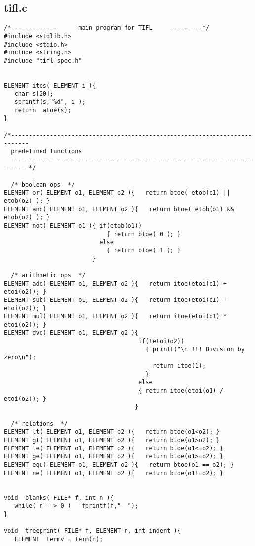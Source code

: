 \subsection{tifl.c}
\begin{verbatim}
/*-------------      main program for TIFL     ---------*/
#include <stdlib.h>
#include <stdio.h>
#include <string.h>
#include "tifl_spec.h"


ELEMENT itos( ELEMENT i ){
   char s[20];
   sprintf(s,"%d", i );
   return  atoe(s);
}

/*---------------------------------------------------------------------------
  predefined functions 
  ---------------------------------------------------------------------------*/

  /* boolean ops  */
ELEMENT or( ELEMENT o1, ELEMENT o2 ){   return btoe( etob(o1) || etob(o2) ); } 
ELEMENT and( ELEMENT o1, ELEMENT o2 ){   return btoe( etob(o1) && etob(o2) ); }
ELEMENT not( ELEMENT o1 ){ if(etob(o1))
                             { return btoe( 0 ); }
                           else 
                             { return btoe( 1 ); }
                         }

  /* arithmetic ops  */
ELEMENT add( ELEMENT o1, ELEMENT o2 ){   return itoe(etoi(o1) + etoi(o2)); }
ELEMENT sub( ELEMENT o1, ELEMENT o2 ){   return itoe(etoi(o1) - etoi(o2)); }
ELEMENT mul( ELEMENT o1, ELEMENT o2 ){   return itoe(etoi(o1) * etoi(o2)); }
ELEMENT dvd( ELEMENT o1, ELEMENT o2 ){   
                                      if(!etoi(o2))
                                        { printf("\n !!! Division by zero\n");
                                          return itoe(1);
                                        }
                                      else
                                      { return itoe(etoi(o1) / etoi(o2)); }
                                     }

  /* relations  */
ELEMENT lt( ELEMENT o1, ELEMENT o2 ){   return btoe(o1<o2); }
ELEMENT gt( ELEMENT o1, ELEMENT o2 ){   return btoe(o1>o2); }
ELEMENT le( ELEMENT o1, ELEMENT o2 ){   return btoe(o1<=o2); }
ELEMENT ge( ELEMENT o1, ELEMENT o2 ){   return btoe(o1>=o2); }
ELEMENT equ( ELEMENT o1, ELEMENT o2 ){   return btoe(o1 == o2); }
ELEMENT ne( ELEMENT o1, ELEMENT o2 ){   return btoe(o1!=o2); }


void  blanks( FILE* f, int n ){
   while( n-- > 0 )   fprintf(f,"  ");
}

void  treeprint( FILE* f, ELEMENT n, int indent ){
   ELEMENT  termv = term(n);


\end{verbatim}
